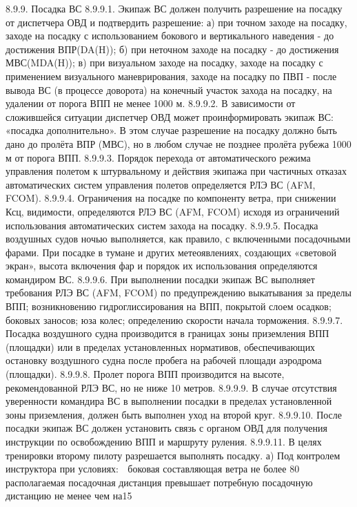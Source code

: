 8.9.9.	Посадка ВС
8.9.9.1. Экипаж ВС должен получить разрешение на посадку от диспетчера ОВД и подтвердить разрешение:
а)	при точном заходе на посадку, заходе на посадку с использованием бокового и вертикального наведения - до достижения ВПР(DA(H));
б)	при неточном заходе на посадку - до достижения МВС(MDA(H));
в)	при визуальном заходе на посадку, заходе на посадку с применением визуального маневрирования, заходе на посадку по ПВП - после вывода ВС (в процессе доворота) на конечный участок захода на посадку, на удалении от порога ВПП не менее 1000 м.
8.9.9.2. В зависимости от сложившейся ситуации диспетчер ОВД может проинформировать экипаж ВС: «посадка дополнительно». В этом случае разрешение на посадку должно быть дано до пролёта ВПР (МВС), но в любом случае не позднее пролёта рубежа 1000 м от порога ВПП.
8.9.9.3. Порядок перехода от автоматического режима управления полетом к штурвальному и действия экипажа при частичных отказах автоматических систем управления полетов определяется РЛЭ ВС (AFM, FCOM).
8.9.9.4. Ограничения на посадке по компоненту ветра, при снижении Ксц, видимости, определяются РЛЭ ВС (AFM, FCOM) исходя из ограничений использования автоматических систем захода на посадку.
8.9.9.5. Посадка воздушных судов ночью выполняется, как правило, с включенными посадочными фарами. При посадке в тумане и других метеоявлениях, создающих «световой экран», высота включения фар и порядок их использования определяются командиром ВС.
8.9.9.6. При выполнении посадки экипаж ВС выполняет требования РЛЭ ВС (AFM, FCOM) по предупреждению выкатывания за пределы ВПП; возникновению гидроглиссирования на ВПП, покрытой слоем осадков; боковых заносов; юза колес; определению скорости начала торможения.
8.9.9.7. Посадка воздушного судна производится в границах зоны приземления ВПП (площадки) или в пределах установленных нормативов, обеспечивающих остановку воздушного судна после пробега на рабочей площади аэродрома (площадки). 
8.9.9.8. Пролет порога ВПП производится на высоте, рекомендованной РЛЭ ВС, но не ниже 10 метров.
8.9.9.9. В случае отсутствия уверенности командира ВС в выполнении посадки в пределах установленной зоны приземления, должен быть выполнен уход на второй круг.
8.9.9.10. После посадки экипаж ВС должен установить связь с органом ОВД для получения инструкции по освобождению ВПП и маршруту руления.
8.9.9.11. В целях тренировки второму пилоту разрешается выполнять посадку.
а)	Под контролем инструктора при условиях:
	боковая составляющая ветра не более 80%
	располагаемая посадочная дистанция превышает потребную посадочную дистанцию не менее чем на15%
